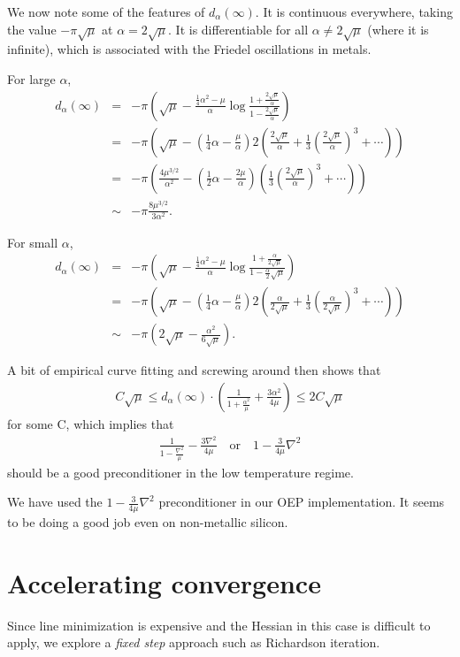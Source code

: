 \documentclass{article}
\newcommand{\beas}{\begin{eqnarray*}}
\newcommand{\enas}{\end{eqnarray*}}
\begin{document}
We now note some of the features of $d_\alpha(\infty)$.  It is continuous
everywhere, taking the value $-\pi\sqrt{\mu}$ at $\alpha = 2\sqrt{\mu}$.
It is differentiable for all $\alpha \ne 2\sqrt{\mu}$
(where it is infinite),
which is associated with the Friedel oscillations in metals.

For large $\alpha$,
\beas
d_\alpha(\infty)
 &=&
-\pi
\left(\sqrt{\mu} - \frac{\frac{1}{4} \alpha^2-\mu}{\alpha}
\log\frac{1+\frac{2\sqrt{\mu}}{\alpha}}{1-\frac{2\sqrt{\mu}}{\alpha}}\right)
\\
 &=&
-\pi
\left(\sqrt{\mu} - \left(\frac{1}{4} \alpha-\frac{\mu}{\alpha}\right)
2 \left(\frac{2\sqrt{\mu}}{\alpha} + \frac{1}{3}\left(\frac{2\sqrt{\mu}}{\alpha}\right)^3 + \cdots\right)\right)
\\
&=&
-\pi
\left(\frac{4 \mu^{3/2}}{\alpha^2}
-\left(\frac{1}{2} \alpha-\frac{2\mu}{\alpha}\right)
\left(\frac{1}{3}\left(\frac{2\sqrt{\mu}}{\alpha}\right)^3 + \cdots\right)
\right)
\\
&\sim&
-\pi
\frac{8 \mu^{3/2}}{3 \alpha^2}.
\enas

For small $\alpha$,
\beas
d_\alpha(\infty)
 &=&
-\pi
\left(\sqrt{\mu} - \frac{\frac{1}{4} \alpha^2-\mu}{\alpha}
\log\frac{1+\frac{\alpha}{2\sqrt{\mu}}}{1-\frac{\alpha}2\sqrt{\mu}}\right)
\\
&=&
-\pi
\left(\sqrt{\mu} - \left(\frac{1}{4} \alpha-\frac{\mu}{\alpha}\right)
2 \left(\frac{\alpha}{2\sqrt{\mu}} + \frac{1}{3}\left(\frac{\alpha}{2\sqrt{\mu}}\right)^3 + \cdots\right)\right)
\\
&\sim&
-\pi
\left(2\sqrt{\mu}
-\frac{\alpha^2}{6\sqrt{\mu}}
\right).
\enas

A bit of empirical curve fitting and screwing around then shows that
\beas
C \sqrt{\mu} \le
d_{\alpha}(\infty) \cdot
\left(
\frac{1}{1+\frac{\alpha^2}{\mu}}
+\frac{3\alpha^2}{4 \mu}\right) \le 2 C \sqrt{\mu}
\enas
for some C, which implies that
\beas
\frac{1}{1-\frac{\nabla^2}{\mu}}
-\frac{3\nabla^2}{4 \mu}
\quad\mbox{or}\quad
1 - \frac{3}{4\mu} \nabla^2
\enas
should be a good preconditioner in the low temperature regime.

We have used the $1 - \frac{3}{4 \mu} \nabla^2$ preconditioner in our
OEP implementation.  It seems to be doing a good job even on non-metallic
silicon.


\section{Accelerating convergence}

Since line minimization is expensive and the Hessian in this
case is difficult to apply, we explore a {\em fixed step}
approach such as Richardson iteration.
\end{document}
